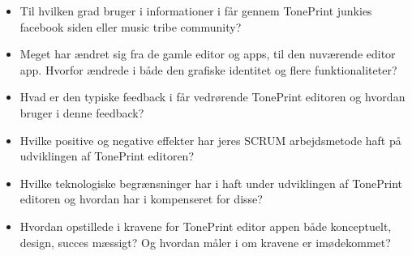 \begin{itemize}
  \item Til hvilken grad bruger i informationer i får gennem TonePrint junkies facebook siden eller music tribe community? 
  \item Meget har ændret sig fra de gamle editor og apps, til den nuværende editor app. Hvorfor ændrede i både den grafiske identitet og flere funktionaliteter?
  \item Hvad er den typiske feedback i får vedrørende TonePrint editoren og hvordan bruger i denne feedback?
  \item Hvilke positive og negative effekter har jeres SCRUM arbejdsmetode haft på udviklingen af TonePrint editoren?
  \item Hvilke teknologiske begrænsninger har i haft under udviklingen af TonePrint editoren og hvordan har i kompenseret for disse?
  \item Hvordan opstillede i kravene for TonePrint editor appen både konceptuelt, design, succes mæssigt? Og hvordan måler i om kravene er imødekommet? 
\end{itemize}
%
%
%
